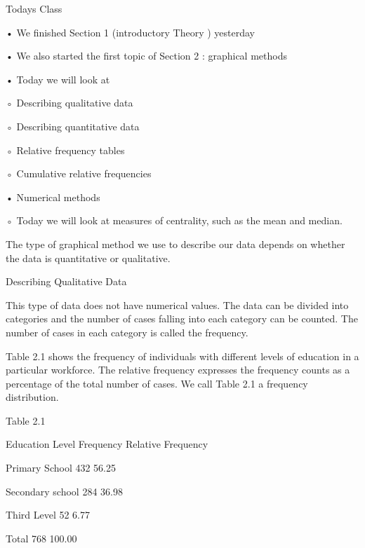 
 

Todays Class

 
•
We finished Section 1 (introductory Theory ) yesterday


 
•
We also started the first topic of Section 2 : graphical methods


 
•
Today we will look at

◦
Describing qualitative data

◦
Describing quantitative data

◦
Relative frequency tables

◦
Cumulative relative frequencies


 
•
Numerical methods

◦
Today we will look at measures of centrality, such as the mean and median.


 

 



 The type of graphical method we use to describe our data depends on whether the data is quantitative or qualitative.

 

Describing Qualitative Data

 

This type of data does not have numerical values. The data can be divided into categories and the number of cases falling into each category can be counted. The number of cases in each category is called the frequency.

 

Table 2.1 shows the frequency of individuals with different levels of education in a particular workforce. The relative frequency expresses the frequency counts as a percentage of the total number of cases. We call Table 2.1 a frequency distribution.

 

Table 2.1

 

Education Level        Frequency      Relative Frequency

Primary School           432                 56.25 %

Secondary school       284                 36.98 %

Third Level                 52                   6.77 %

Total                        768                100.00 %

